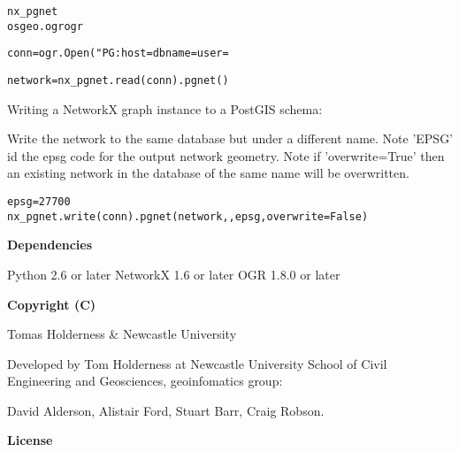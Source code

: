 \begin{alltt}
\pysrcprompt{{\textgreater}{\textgreater}{\textgreater} } nx\_pgnet
\pysrcprompt{{\textgreater}{\textgreater}{\textgreater} } osgeo.ogr  ogr\end{alltt}
\begin{alltt}
\pysrcprompt{{\textgreater}{\textgreater}{\textgreater} }
\pysrcprompt{{\textgreater}{\textgreater}{\textgreater} }conn = ogr.Open("PG: host= dbname= user=
\end{alltt}
\begin{alltt}
\pysrcprompt{{\textgreater}{\textgreater}{\textgreater} }
\pysrcprompt{{\textgreater}{\textgreater}{\textgreater} }\end{alltt}
\begin{alltt}
\pysrcprompt{{\textgreater}{\textgreater}{\textgreater} }network = nx\_pgnet.read(conn).pgnet()\end{alltt}
Writing a NetworkX graph instance to a PostGIS schema:

Write the network to the same database but under a different name. Note 
'EPSG' id the epsg code for the output network geometry. Note if 
'overwrite=True' then an existing network in the database of the same name 
will be overwritten.

\begin{alltt}
\pysrcprompt{{\textgreater}{\textgreater}{\textgreater} }epsg = 27700
\pysrcprompt{{\textgreater}{\textgreater}{\textgreater} }nx\_pgnet.write(conn).pgnet(network, , epsg, overwrite=False)\end{alltt}
\textbf{Dependencies}

Python 2.6 or later NetworkX 1.6 or later OGR 1.8.0 or later

\textbf{Copyright (C)}

Tomas Holderness \& Newcastle University

Developed by Tom Holderness at Newcastle University School of Civil 
Engineering and Geosciences, geoinfomatics group:

David Alderson, Alistair Ford, Stuart Barr, Craig Robson.

\textbf{License}

